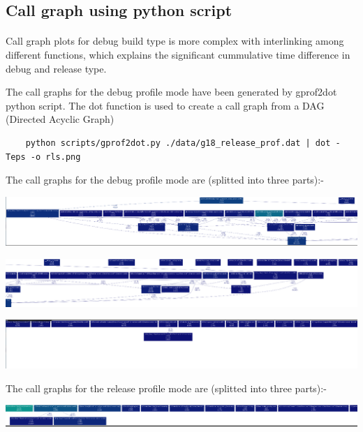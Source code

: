 \documentclass[11pt]{article}
\begin{document}
\subsection{Call graph using python script}
\paragraph{}
Call graph plots for debug build type is more complex with interlinking among different functions, which explains 
the significant cummulative time difference in debug and release type. 

The call graphs for the debug profile mode have been generated by gprof2dot python 
script. The dot function is used to create a call graph from a DAG (Directed Acyclic Graph)

\begin{lstlisting}
	python scripts/gprof2dot.py ./data/g18_release_prof.dat | dot -Teps -o rls.png
\end{lstlisting}

The call graphs for the debug profile mode are (splitted into three parts):-

\begin{center}
 \includegraphics[scale = 0.35]{images/dbg1} \\
\end{center}

\begin{center}
 \includegraphics[scale = 0.35]{images/dbg2} \\
\end{center}

\begin{center}
 \includegraphics[scale = 0.35]{images/dbg3} \\
\end{center}

The call graphs for the release profile mode are (splitted into three parts):-
\begin{center}
 \includegraphics[scale = 0.35]{images/rls1} \\
\end{center}
\end{document}
